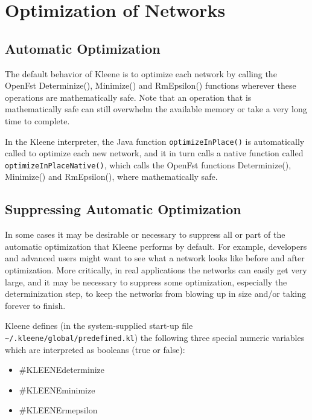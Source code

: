 \chapter{Optimization of Networks}

\label{app:optimize}

\section{Automatic Optimization}

The default behavior of Kleene is to optimize each network by calling
the OpenFst Determinize(), Minimize() and RmEpsilon() functions wherever
these operations are mathematically safe.  Note that an operation that is
mathematically safe can still overwhelm the available memory or
take a very long time to complete.

In the Kleene interpreter, the Java function \texttt{optimizeInPlace()}
is automatically called to optimize each new network, and it in turn
calls a native \CPP{} function called \texttt{optimizeInPlaceNative()},
which calls the OpenFst functions 
Determinize(), Minimize() and RmEpsilon(), where
mathematically safe.

\section{Suppressing Automatic Optimization}

In some cases it may be desirable or necessary to suppress all or part of
the automatic optimization that Kleene performs by default.  For example,
developers and advanced users might want to see what a network looks like
before and after optimization.  More critically, in real applications the
networks can easily get very large, and it may be necessary to suppress
some optimization, especially the determinization step, to keep the
networks from blowing up in size and/or taking forever to finish.

Kleene defines (in the system-supplied 
start-up file \verb!~/.kleene/global/predefined.kl!) the following three
special numeric variables which are interpreted as booleans (true or
false):

\begin{itemize}
\item
\#KLEENEdeterminize
\item
\#KLEENEminimize
\item
\#KLEENErmepsilon
\end{itemize}


